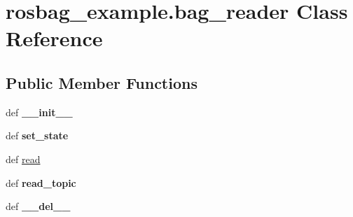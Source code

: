 \hypertarget{classrosbag__example_1_1bag__reader}{\section{rosbag\-\_\-example.\-bag\-\_\-reader Class Reference}
\label{classrosbag__example_1_1bag__reader}
}
\subsection*{Public Member Functions}
\begin{DoxyCompactItemize}
\item 
\hypertarget{classrosbag__example_1_1bag__reader_a2d1d579f6b6903800ad345a46f5d2c9f}{def {\bfseries \-\_\-\-\_\-init\-\_\-\-\_\-}}\label{classrosbag__example_1_1bag__reader_a2d1d579f6b6903800ad345a46f5d2c9f}

\item 
\hypertarget{classrosbag__example_1_1bag__reader_a24bb8f0a3460b1484d48580d1d394c3e}{def {\bfseries set\-\_\-state}}\label{classrosbag__example_1_1bag__reader_a24bb8f0a3460b1484d48580d1d394c3e}

\item 
def \hyperlink{classrosbag__example_1_1bag__reader_a7ff5add29bc8d173e7d5d112b9b872cd}{read}
\item 
\hypertarget{classrosbag__example_1_1bag__reader_aa109bb311bfaa7f7f10c4e6a4685a032}{def {\bfseries read\-\_\-topic}}\label{classrosbag__example_1_1bag__reader_aa109bb311bfaa7f7f10c4e6a4685a032}

\item 
\hypertarget{classrosbag__example_1_1bag__reader_acff0680b8dfb09b77bc6f7979d62e7a0}{def {\bfseries \-\_\-\-\_\-del\-\_\-\-\_\-}}\label{classrosbag__example_1_1bag__reader_acff0680b8dfb09b77bc6f7979d62e7a0}

\end{DoxyCompactItemize}
